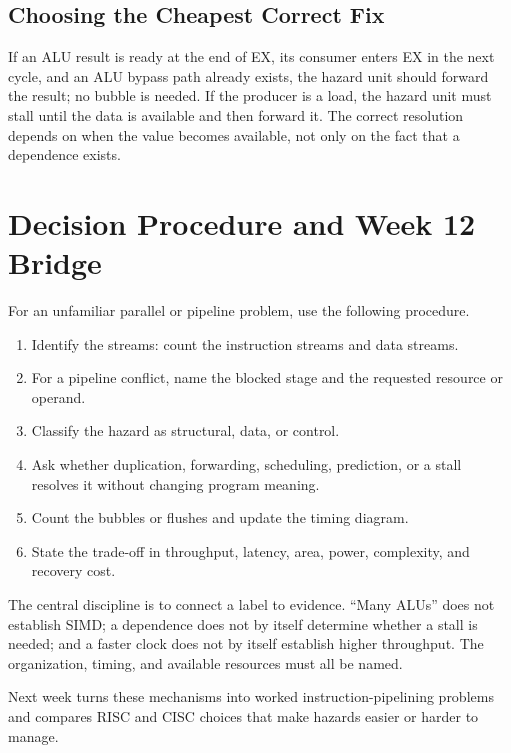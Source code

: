 \documentclass[11pt]{article}
\begin{document}
\subsection{Choosing the Cheapest Correct Fix}

If an ALU result is ready at the end of EX, its consumer enters EX in the next
cycle, and an ALU bypass path already exists, the hazard unit should forward
the result; no bubble is needed. If the producer is a load, the hazard unit
must stall until the data is available and then forward it. The correct
resolution depends on when the value becomes available, not only on the fact
that a dependence exists.

\section{Decision Procedure and Week 12 Bridge}
\label{sec:synthesis}

For an unfamiliar parallel or pipeline problem, use the following procedure.
\begin{enumerate}
  \item Identify the streams: count the instruction streams and data streams.
  \item For a pipeline conflict, name the blocked stage and the requested
        resource or operand.
  \item Classify the hazard as structural, data, or control.
  \item Ask whether duplication, forwarding, scheduling, prediction, or a
        stall resolves it without changing program meaning.
  \item Count the bubbles or flushes and update the timing diagram.
  \item State the trade-off in throughput, latency, area, power, complexity,
        and recovery cost.
\end{enumerate}

The central discipline is to connect a label to evidence. ``Many ALUs'' does
not establish SIMD; a dependence does not by itself determine whether a stall
is needed; and a faster clock does not by itself establish higher throughput.
The organization, timing, and available resources must all be named.

Next week turns these mechanisms into worked instruction-pipelining problems
and compares RISC and CISC choices that make hazards easier or harder to
manage.
\end{document}
